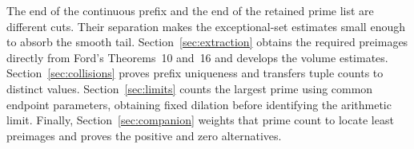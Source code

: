 The end of the continuous prefix and the end of the retained prime list
are different cuts. Their separation makes the exceptional-set estimates
small enough to absorb the smooth tail. Section~\ref{sec:extraction}
obtains the required preimages directly from Ford's Theorems~10 and~16
and develops the volume estimates. Section~\ref{sec:collisions} proves
prefix uniqueness and transfers tuple counts to distinct values.
Section~\ref{sec:limits} counts the largest prime using common endpoint
parameters, obtaining fixed dilation before identifying the arithmetic
limit. Finally, Section~\ref{sec:companion} weights that prime count to
locate least preimages and proves the positive and zero alternatives.
